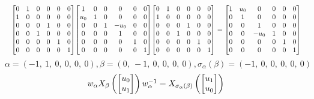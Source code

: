 \documentclass[11pt]{article}
\theoremstyle{definition}
\begin{document}
\[
\scaletoalign{\textwidth}{{\left[\begin{matrix}0 & 1 & 0 & 0 & 0 & 0\\1 & 0 & 0 & 0 & 0 & 0\\0 & 0 & 0 & 1 & 0 & 0\\0 & 0 & 1 & 0 & 0 & 0\\0 & 0 & 0 & 0 & 1 & 0\\0 & 0 & 0 & 0 & 0 & 1\end{matrix}\right]} {\left[\begin{matrix}1 & 0 & 0 & 0 & 0 & 0\\u_{0} & 1 & 0 & 0 & 0 & 0\\0 & 0 & 1 & - u_{0} & 0 & 0\\0 & 0 & 0 & 1 & 0 & 0\\0 & 0 & 0 & 0 & 1 & 0\\0 & 0 & 0 & 0 & 0 & 1\end{matrix}\right]} {\left[\begin{matrix}0 & 1 & 0 & 0 & 0 & 0\\1 & 0 & 0 & 0 & 0 & 0\\0 & 0 & 0 & 1 & 0 & 0\\0 & 0 & 1 & 0 & 0 & 0\\0 & 0 & 0 & 0 & 1 & 0\\0 & 0 & 0 & 0 & 0 & 1\end{matrix}\right]} = {\left[\begin{matrix}1 & u_{0} & 0 & 0 & 0 & 0\\0 & 1 & 0 & 0 & 0 & 0\\0 & 0 & 1 & 0 & 0 & 0\\0 & 0 & - u_{0} & 1 & 0 & 0\\0 & 0 & 0 & 0 & 1 & 0\\0 & 0 & 0 & 0 & 0 & 1\end{matrix}\right]}}
\]
\[
\alpha = \left( -1, \  1, \  0, \  0, \  0, \  0\right), \beta = \left( 0, \  -1, \  0, \  0, \  0, \  0\right), \sigma_{\alpha}(\beta) = \left( -1, \  0, \  0, \  0, \  0, \  0\right)
\]
\[
\scaletoalign{\textwidth}{w_{\alpha} X_{\beta}\left(\left[\begin{matrix}u_{0}\\u_{1}\end{matrix}\right]\right) w_{\alpha}^{-1} = X_{\sigma_{\alpha}\left(\beta\right)}\left(\left[\begin{matrix}u_{1}\\u_{0}\end{matrix}\right]\right)}
\]
\end{document}
